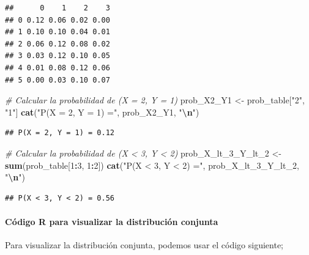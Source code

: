 \documentclass[
]{article}
\newenvironment{Shaded}{\begin{snugshade}}{\end{snugshade}}
\newcommand{\CommentTok}[1]{\textcolor[rgb]{0.56,0.35,0.01}{\textit{#1}}}
\newcommand{\DecValTok}[1]{\textcolor[rgb]{0.00,0.00,0.81}{#1}}
\newcommand{\FunctionTok}[1]{\textcolor[rgb]{0.13,0.29,0.53}{\textbf{#1}}}
\newcommand{\NormalTok}[1]{#1}
\newcommand{\OtherTok}[1]{\textcolor[rgb]{0.56,0.35,0.01}{#1}}
\newcommand{\SpecialCharTok}[1]{\textcolor[rgb]{0.81,0.36,0.00}{\textbf{#1}}}
\newcommand{\StringTok}[1]{\textcolor[rgb]{0.31,0.60,0.02}{#1}}
\begin{document}
\begin{verbatim}
##      0    1    2    3
## 0 0.12 0.06 0.02 0.00
## 1 0.10 0.10 0.04 0.01
## 2 0.06 0.12 0.08 0.02
## 3 0.03 0.12 0.10 0.05
## 4 0.01 0.08 0.12 0.06
## 5 0.00 0.03 0.10 0.07
\end{verbatim}

\begin{Shaded}
\begin{Highlighting}[]
\CommentTok{\# Calcular la probabilidad de (X = 2, Y = 1)}
\NormalTok{prob\_X2\_Y1 }\OtherTok{\textless{}{-}}\NormalTok{ prob\_table[}\StringTok{"2"}\NormalTok{, }\StringTok{"1"}\NormalTok{]}
\FunctionTok{cat}\NormalTok{(}\StringTok{"P(X = 2, Y = 1) ="}\NormalTok{, prob\_X2\_Y1, }\StringTok{"}\SpecialCharTok{\textbackslash{}n}\StringTok{"}\NormalTok{)}
\end{Highlighting}
\end{Shaded}

\begin{verbatim}
## P(X = 2, Y = 1) = 0.12
\end{verbatim}

\begin{Shaded}
\begin{Highlighting}[]
\CommentTok{\# Calcular la probabilidad de (X \textless{} 3, Y \textless{} 2)}
\NormalTok{prob\_X\_lt\_3\_Y\_lt\_2 }\OtherTok{\textless{}{-}} \FunctionTok{sum}\NormalTok{(prob\_table[}\DecValTok{1}\SpecialCharTok{:}\DecValTok{3}\NormalTok{, }\DecValTok{1}\SpecialCharTok{:}\DecValTok{2}\NormalTok{])}
\FunctionTok{cat}\NormalTok{(}\StringTok{"P(X \textless{} 3, Y \textless{} 2) ="}\NormalTok{, prob\_X\_lt\_3\_Y\_lt\_2, }\StringTok{"}\SpecialCharTok{\textbackslash{}n}\StringTok{"}\NormalTok{)}
\end{Highlighting}
\end{Shaded}

\begin{verbatim}
## P(X < 3, Y < 2) = 0.56
\end{verbatim}

\paragraph{Código R para visualizar la distribución conjunta}\label{cuxf3digo-r-para-visualizar-la-distribuciuxf3n-conjunta}

Para visualizar la distribución conjunta, podemos usar el código siguiente;
\end{document}
